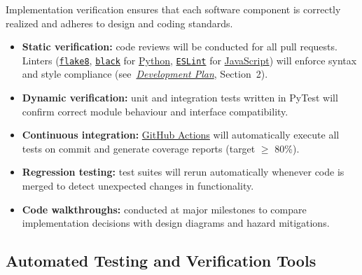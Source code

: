 \documentclass[12pt, titlepage]{article}
\begin{document}
Implementation verification ensures that each software component is correctly
realized and adheres to design and coding standards.

\begin{itemize}
  \item \textbf{Static verification:} code reviews will be conducted for all pull
  requests. Linters (\texttt{\href{https://flake8.pycqa.org/en/latest/}{flake8}}, \texttt{\href{https://github.com/psf/black}{black}} for \href{https://www.python.org/}{Python}, \texttt{\href{https://eslint.org/}{ESLint}}
  for \href{https://developer.mozilla.org/en-US/docs/Web/JavaScript}{JavaScript}) will enforce syntax and style compliance
  (see~\textit{\href{https://github.com/thaafei/DomainX/blob/main/docs/DevelopmentPlan/DevelopmentPlan.pdf}{Development Plan}}, Section~2).

  \item \textbf{Dynamic verification:} unit and integration tests written in
  PyTest will confirm correct module behaviour and interface compatibility.

  \item \textbf{Continuous integration:} \href{https://github.com/thaafei/DomainX/actions}{GitHub Actions} will automatically
  execute all tests on commit and generate coverage reports (target $\geq$ 80\%).

  \item \textbf{Regression testing:} test suites will rerun automatically whenever
  code is merged to detect unexpected changes in functionality.

  \item \textbf{Code walkthroughs:} conducted at major milestones to compare
  implementation decisions with design diagrams and hazard mitigations.
\end{itemize}

\subsection{Automated Testing and Verification Tools}
\label{subsec:testing-tools}
\end{document}
